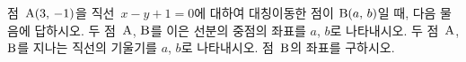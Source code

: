 점~$\mathrm{A}(3,\,-1)$을 직선~$x-y+1=0$에 대하여 대칭이동한 점이 $\mathrm{B}(a,\,b)$일 때, 다음 물음에 답하시오.
 두 점~$\mathrm{A}$, $\mathrm{B}$를 이은 선분의 중점의 좌표를 $a$, $b$로 나타내시오.
 두 점~$\mathrm{A}$, $\mathrm{B}$를 지나는 직선의 기울기를 $a$, $b$로 나타내시오.
 점~$\mathrm{B}$의 좌표를 구하시오.
